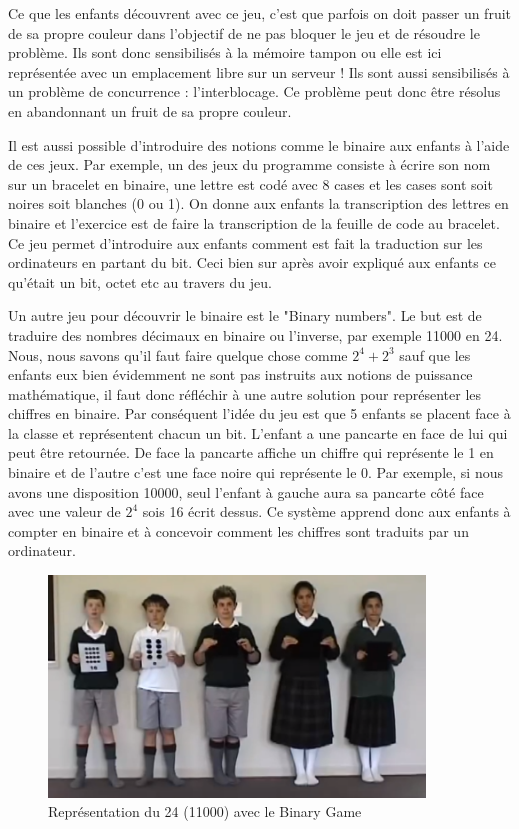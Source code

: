 Ce que les enfants découvrent avec ce jeu, c'est que parfois on doit passer un fruit de sa propre couleur dans l'objectif de ne pas bloquer le jeu et de résoudre le problème. Ils sont donc sensibilisés à la mémoire tampon ou elle est ici représentée avec un emplacement libre sur un serveur ! Ils sont aussi sensibilisés à un problème de concurrence : l'interblocage. Ce problème peut donc être résolus en abandonnant un fruit de sa propre couleur.

Il est aussi possible d'introduire des notions comme le binaire aux enfants à l'aide de ces jeux. \cite{31} Par exemple, un des jeux du programme consiste à écrire son nom sur un bracelet en binaire, une lettre est codé avec 8 cases et les cases sont soit noires soit blanches (0 ou 1). On donne aux enfants la transcription des lettres en binaire et l'exercice est de faire la transcription de la feuille de code au bracelet. Ce jeu permet d'introduire aux enfants comment est fait la traduction sur les ordinateurs en partant du bit. Ceci bien sur après avoir expliqué aux enfants ce qu'était un bit, octet etc au travers du jeu. 

Un autre jeu pour découvrir le binaire est le "Binary numbers". \cite{32} Le but est de traduire des nombres décimaux en binaire ou l'inverse, par exemple 11000 en 24. Nous, nous savons qu'il faut faire quelque chose comme ${2^4 + 2^3}$ sauf que les enfants eux bien évidemment ne sont pas instruits aux notions de puissance mathématique, il faut donc réfléchir à une autre solution pour représenter les chiffres en binaire. Par conséquent l'idée du jeu est que 5 enfants se placent face à la classe et représentent chacun un bit. L'enfant a une pancarte en face de lui qui peut être retournée. De face la pancarte affiche un chiffre qui représente le 1 en binaire et de l'autre c'est une face noire qui représente le 0. Par exemple, si nous avons une disposition 10000, seul l'enfant à gauche aura sa pancarte côté face avec une valeur de ${2^4}$ sois 16 écrit dessus. Ce système apprend donc aux enfants à compter en binaire et à concevoir comment les chiffres sont traduits par un ordinateur.

\newpage

\begin{figure}[!htb]
  \centering
  \includegraphics[width=100mm,scale=0.5]{images/binary-game.PNG}
  \caption{Représentation du 24 (11000) avec le Binary Game}
  \label{fig:boat1}
\end{figure}

